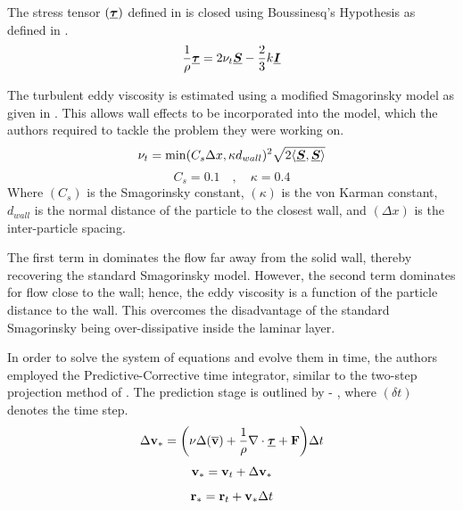 The stress tensor $(\underline{\bm{\tau}})$ defined in  is closed using Boussinesq’s Hypothesis as defined in .
\begin{equation}
    \frac{1}{\rho} \underline{\bm{\tau}} = 2\nu_t \underline{\bm{S}} - \frac{2}{3}k\underline{\bm{I}}
    \label{eq:Gotoh2004-boussinesq}
\end{equation}

The turbulent eddy viscosity is estimated using a modified Smagorinsky model as given in . This allows wall effects to be incorporated into the model, which the authors required to tackle the problem they were working on.
\begin{equation}
    \nu_t = \min(C_s \Delta x, \kappa d_{wall})^2 \sqrt{2 \langle \underline{\bm{S}}, \underline{\bm{S}} \rangle}
    \label{eq:Gotoh2004-eddy-visc}
\end{equation}
\begin{equation}
    C_s=0.1 \quad , \quad \kappa=0.4
\end{equation}
Where $(C_s)$ is the Smagorinsky constant, $(\kappa)$ is the von Karman constant, $d_{wall}$ is the normal distance of the particle to the closest wall, and $(\Delta x)$ is the inter-particle spacing.

The first term in  dominates the flow far away from the solid wall, thereby recovering the standard Smagorinsky model. However, the second term dominates for flow close to the wall; hence, the eddy viscosity is a function of the particle distance to the wall. This overcomes the disadvantage of the standard Smagorinsky being over-dissipative inside the laminar layer.

In order to solve the system of equations and evolve them in time, the authors employed the Predictive-Corrective time integrator, similar to the two-step projection method of \cite{chorin1968numerical}. The prediction stage is outlined by  - , where $(\delta t)$ denotes the time step.
\begin{equation}
    \Delta \mathbf{v}_* = \bigg( \nu \Delta ( \mathbf{\overline{v}} ) + \frac{1}{\rho}\nabla\cdot\underline{\bm{\tau}} + \mathbf{F} \bigg) \Delta t
    \label{eq:Gotoh2004-predict-start}
\end{equation}
\begin{equation}
    \mathbf{v}_* = \mathbf{v}_t + \Delta \mathbf{v}_*
\end{equation}
\begin{equation}
    \mathbf{r}_* = \mathbf{r}_t + \mathbf{v}_* \Delta t
    \label{eq:Gotoh2004-predict-end}
\end{equation}

